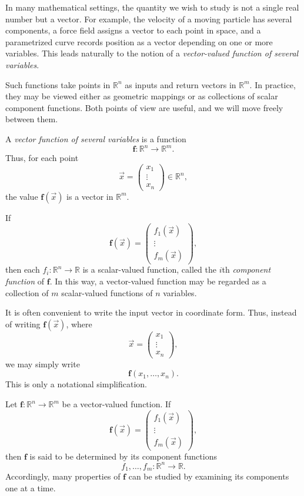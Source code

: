 In many mathematical settings, the quantity we wish to study is not a single real number but a vector. For example, the velocity of a moving particle has several components, a force field assigns a vector to each point in space, and a parametrized curve records position as a vector depending on one or more variables. This leads naturally to the notion of a \emph{vector-valued function of several variables}.

Such functions take points in $\mathbb{R}^n$ as inputs and return vectors in $\mathbb{R}^m$. In practice, they may be viewed either as geometric mappings or as collections of scalar component functions. Both points of view are useful, and we will move freely between them.

\begin{definition}
A \emph{vector function of several variables} is a function
\[
\mathbf{f}:\mathbb{R}^n\to\mathbb{R}^m.
\]
Thus, for each point
\[
\vec x=
\begin{pmatrix}
x_1\\
\vdots\\
x_n
\end{pmatrix}
\in\mathbb{R}^n,
\]
the value $\mathbf{f}(\vec x)$ is a vector in $\mathbb{R}^m$.

If
\[
\mathbf{f}(\vec x)=
\begin{pmatrix}
f_1(\vec x)\\
\vdots\\
f_m(\vec x)
\end{pmatrix},
\]
then each $f_i:\mathbb{R}^n\to\mathbb{R}$ is a scalar-valued function, called the $i$th \emph{component function} of $\mathbf{f}$. In this way, a vector-valued function may be regarded as a collection of $m$ scalar-valued functions of $n$ variables.
\end{definition}

It is often convenient to write the input vector in coordinate form. Thus, instead of writing $\mathbf{f}(\vec x)$, where
\[
\vec x=
\begin{pmatrix}
x_1\\
\vdots\\
x_n
\end{pmatrix},
\]
we may simply write
\[
\mathbf{f}(x_1,\dots,x_n).
\]
This is only a notational simplification.

\begin{definition}
Let $\mathbf{f}:\mathbb{R}^n\to\mathbb{R}^m$ be a vector-valued function. If
\[
\mathbf{f}(\vec x)=
\begin{pmatrix}
f_1(\vec x)\\
\vdots\\
f_m(\vec x)
\end{pmatrix},
\]
then $\mathbf{f}$ is said to be determined by its component functions
\[
f_1,\dots,f_m:\mathbb{R}^n\to\mathbb{R}.
\]
Accordingly, many properties of $\mathbf{f}$ can be studied by examining its components one at a time.
\end{definition}

